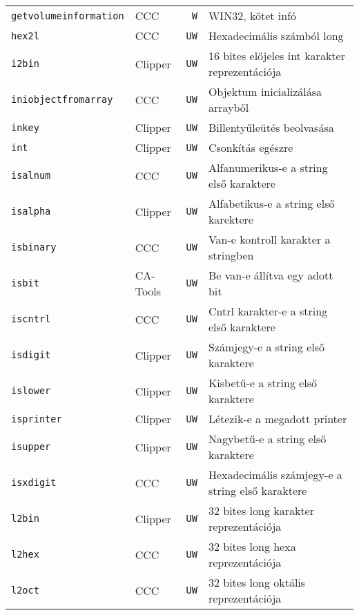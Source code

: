 \begin{tabular}{|l|l|l|l|}
\verb!getvolumeinformation!        & CCC      &  {\tt ~W} & WIN32, kötet infó\\
\verb!hex2l!                       & CCC      &  {\tt UW} & Hexadecimális számból long\\
\verb!i2bin!                       & Clipper  &  {\tt UW} & 16 bites előjeles int karakter reprezentációja\\   
\verb!iniobjectfromarray!          & CCC      &  {\tt UW} & Objektum inicializálása arrayből\\   
\verb!inkey!                       & Clipper  &  {\tt UW} & Billentyűleütés beolvasása\\   
\verb!int!                         & Clipper  &  {\tt UW} & Csonkítás egészre\\   
\verb!isalnum!                     & CCC      &  {\tt UW} & Alfanumerikus-e a string első karaktere\\
\verb!isalpha!                     & Clipper  &  {\tt UW} & Alfabetikus-e a string első karektere\\
\verb!isbinary!                    & CCC      &  {\tt UW} & Van-e kontroll karakter a stringben\\
\verb!isbit!                       & CA-Tools &  {\tt UW} & Be van-e állítva egy adott bit\\
\verb!iscntrl!                     & CCC      &  {\tt UW} & Cntrl karakter-e a string első karaktere\\
\verb!isdigit!                     & Clipper  &  {\tt UW} & Számjegy-e a string első karaktere\\
\verb!islower!                     & Clipper  &  {\tt UW} & Kisbetű-e a string első karaktere\\
\verb!isprinter!                   & Clipper  &  {\tt UW} & Létezik-e a megadott printer\\
\verb!isupper!                     & Clipper  &  {\tt UW} & Nagybetű-e a string első karaktere\\
\verb!isxdigit!                    & CCC      &  {\tt UW} & Hexadecimális számjegy-e a string első karaktere\\
\verb!l2bin!                       & Clipper  &  {\tt UW} & 32 bites long karakter reprezentációja\\
\verb!l2hex!                       & CCC      &  {\tt UW} & 32 bites long hexa reprezentációja\\
\verb!l2oct!                       & CCC      &  {\tt UW} & 32 bites long oktális reprezentációja\\

\end{tabular}

